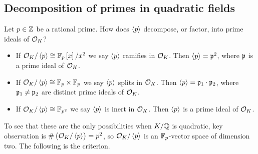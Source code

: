 \pagebreak

\subsection{Decomposition of primes in quadratic fields}

Let $ p \in \mathbb{Z} $ be a rational prime. How does $ \left\langle p \right\rangle $ decompose, or factor, into prime ideals of $ \mathcal{O}_K $?
\begin{itemize}
\item If $ \OO_K / \abr{p} \cong \F_p\sbr{x} / x^2 $ we say $ \left\langle p \right\rangle $ ramifies in $ \mathcal{O}_K $. Then $ \left\langle p \right\rangle = \mathfrak{p}^2 $, where $ \mathfrak{p} $ is a prime ideal of $ \mathcal{O}_K $.
\item If $ \mathcal{O}_K / \left\langle p \right\rangle \cong \mathbb{F}_p \times \mathbb{F}_p $ we say $ \left\langle p \right\rangle $ splits in $ \mathcal{O}_K $. Then $ \left\langle p \right\rangle = \mathfrak{p}_1 \cdot \mathfrak{p}_2 $, where $ \mathfrak{p}_1 \ne \mathfrak{p}_2 $ are distinct prime ideals of $ \mathcal{O}_K $.
\item If $ \mathcal{O}_K / \left\langle p \right\rangle \cong \mathbb{F}_{p^2} $ we say $ \left\langle p \right\rangle $ is inert in $ \mathcal{O}_K $. Then $ \left\langle p \right\rangle $ is a prime ideal of $ \mathcal{O}_K $.
\end{itemize}
To see that these are the only possibilities when $ K / \mathbb{Q} $ is quadratic, key observation is $ \#\br{\OO_K / \abr{p}} = p^2 $, so $ \mathcal{O}_K / \left\langle p \right\rangle $ is an $ \mathbb{F}_p $-vector space of dimension two. The following is the criterion.


